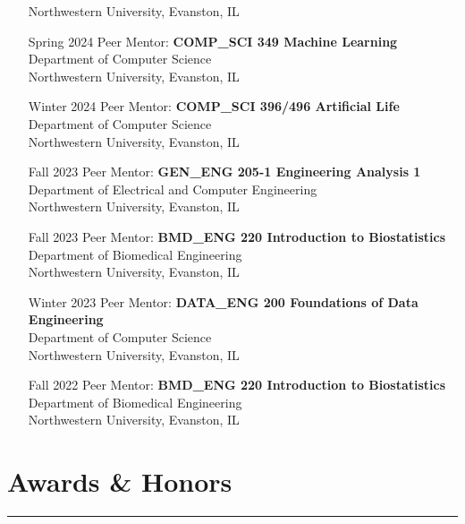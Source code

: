 \documentclass{article}
\begin{document}
\begin{itemize}[leftmargin=1.5in]
    Northwestern University, Evanston, IL
    \item[Spring 2024] Peer Mentor: \textbf{COMP\_SCI 349 Machine Learning}\\
    Department of Computer Science\\
    Northwestern University, Evanston, IL
    \item[Winter 2024] Peer Mentor: \textbf{COMP\_SCI 396/496 Artificial Life}\\
    Department of Computer Science\\
    Northwestern University, Evanston, IL
    \item[Fall 2023] Peer Mentor: \textbf{GEN\_ENG 205-1 Engineering Analysis 1}\\
    Department of Electrical and Computer Engineering\\
    Northwestern University, Evanston, IL
    \item[Fall 2023] Peer Mentor: \textbf{BMD\_ENG 220 Introduction to Biostatistics}\\
    Department of Biomedical Engineering\\
    Northwestern University, Evanston, IL
    \item[Winter 2023] Peer Mentor: \textbf{DATA\_ENG 200 Foundations of Data Engineering}\\
    Department of Computer Science\\
    Northwestern University, Evanston, IL
    \item[Fall 2022] Peer Mentor: \textbf{BMD\_ENG 220 Introduction to Biostatistics}\\
    Department of Biomedical Engineering\\
    Northwestern University, Evanston, IL
\end{itemize}

\section*{Awards \& Honors}
\hrule
\vspace{10pt}
\end{document}
